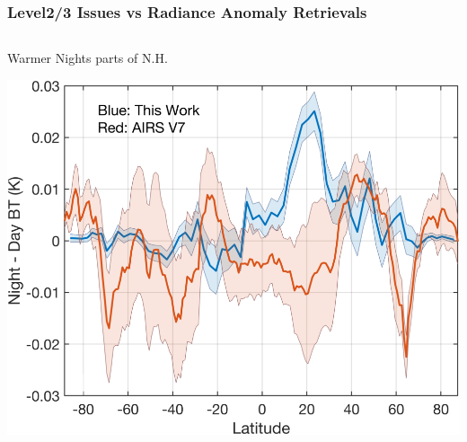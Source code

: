 \documentclass[10pt,t]{beamer}
\begin{document}
\begin{frame}
\frametitle{Level2/3 Issues vs Radiance Anomaly Retrievals}
\vspace{-0.2in}

\begin{columns}
\begin{column}{0.55\columnwidth}
\begin{block}{\footnotesize Warmer Nights parts of N.H.}
\vspace{-0.1in}
\begin{center}
\includegraphics[width=\linewidth]{./Figs21/desc_minus_asc_5pc_hot_bt_trend_with_airs_v7.png}
\end{center}
\end{block}
\end{column}



\end{columns}
\end{frame}
\end{document}
